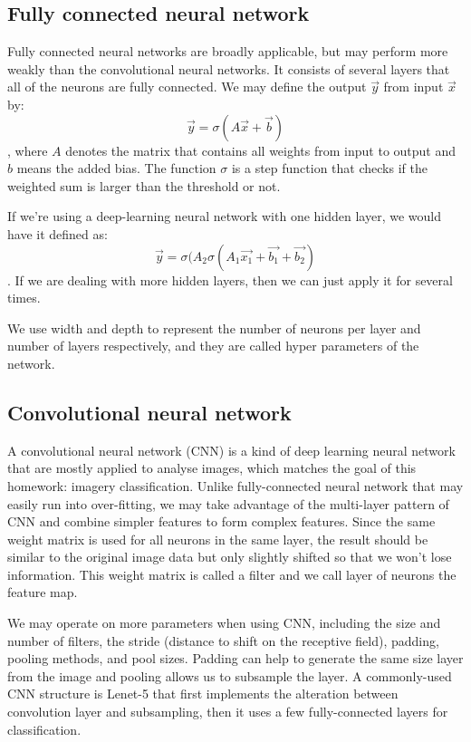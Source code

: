 \documentclass[10pt]{article}
\begin{document}
\subsection{Fully connected neural network}
Fully connected neural networks are broadly applicable, but may perform more weakly than the convolutional neural networks. It consists of several layers that all of the neurons are fully connected. We may define the output $\vec{y}$ from input $\vec{x}$ by:
\begin{equation}\label{1}
\vec{y} = \sigma (A \vec{x} + \vec{b})
\end{equation}
, where $A$ denotes the matrix that contains all weights from input to output and $b$ means the added bias. The function $\sigma$ is a step function that checks if the weighted sum is larger than the threshold or not.
\par
\vskip 0.2cm
If we're using a deep-learning neural network with one hidden layer, we would have it defined as:
\begin{equation}\label{2}
\vec{y} = \sigma (A_2\sigma (A_1 \vec{x_1} + \vec{b_1} + \vec{b_2})
\end{equation}
. If we are dealing with more hidden layers, then we can just apply it for several times.
\par
\vskip 0.2cm
We use width and depth to represent the number of neurons per layer and number of layers respectively, and they are called hyper parameters of the network.


\subsection{Convolutional neural network}
A convolutional neural network (CNN) is a kind of deep learning neural network that are mostly applied to analyse images, which matches the goal of this homework: imagery classification. Unlike fully-connected neural network that may easily run into over-fitting, we may take advantage of the multi-layer pattern of CNN and combine simpler features to form complex features. Since the same weight matrix is used for all neurons in the same layer, the result should be similar to the original image data but only slightly shifted so that we won't lose information. This weight matrix is called a filter and we call layer of neurons the feature map.
\par
\vskip 0.2cm
We may operate on more parameters when using CNN, including the size and number of filters, the stride (distance to shift on the receptive field), padding, pooling methods, and pool sizes. Padding can help to generate the same size layer from the image and pooling allows us to subsample the layer. A commonly-used CNN structure is Lenet-5 that first implements the alteration between convolution layer and subsampling, then it uses a few fully-connected layers for classification.
\end{document}
